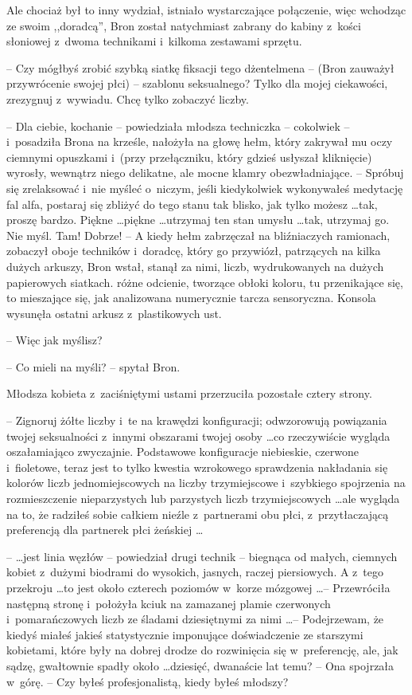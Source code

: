 \documentclass[oneside,polish,11pt,rmheadings]{mwbk}
\begin{document}
Ale chociaż był to inny wydział, istniało wystarczające połączenie, więc wchodząc ze swoim ,,doradcą'', Bron został natychmiast zabrany do kabiny z~kości słoniowej z~dwoma technikami i~kilkoma zestawami sprzętu. 

-- Czy mógłbyś zrobić szybką siatkę fiksacji tego dżentelmena --  (Bron zauważył przywrócenie swojej płci) -- szablonu seksualnego? Tylko dla mojej ciekawości, zrezygnuj z~wywiadu. Chcę tylko zobaczyć liczby. 

-- Dla ciebie, kochanie  -- powiedziała  młodsza techniczka -- cokolwiek -- i~posadziła Brona na krześle, nałożyła na głowę hełm, który zakrywał mu oczy ciemnymi opuszkami i~(przy przełączniku, który gdzieś usłyszał kliknięcie) wyrosły, wewnątrz niego delikatne, ale mocne klamry obezwładniające. -- Spróbuj się zrelaksować i~nie myśleć o~niczym, jeśli kiedykolwiek wykonywałeś medytację fal alfa, postaraj się zbliżyć do tego stanu tak blisko, jak tylko możesz \ldots  tak, proszę bardzo. Piękne \ldots  piękne \ldots  utrzymaj ten stan umysłu \ldots  tak, utrzymaj go. Nie myśl.  Tam! Dobrze! -- A kiedy hełm zabrzęczał na bliźniaczych ramionach, zobaczył oboje techników i~doradcę, który go przywiózł, patrzących na kilka dużych arkuszy, Bron wstał, stanął za nimi, liczb, wydrukowanych na dużych papierowych siatkach. różne odcienie, tworzące obłoki koloru, tu przenikające się, to mieszające się, jak analizowana numerycznie tarcza sensoryczna. Konsola wysunęła ostatni arkusz z~plastikowych ust. 

-- Więc jak myślisz? 

-- Co mieli na myśli? --  spytał Bron. 

Młodsza kobieta z~zaciśniętymi ustami przerzuciła pozostałe cztery strony. 

-- Zignoruj żółte liczby i~te na krawędzi konfiguracji; odwzorowują powiązania twojej seksualności z~innymi obszarami twojej osoby \ldots  co rzeczywiście wygląda oszałamiająco zwyczajnie. Podstawowe konfiguracje niebieskie, czerwone i~fioletowe, teraz jest to tylko kwestia wzrokowego sprawdzenia nakładania się kolorów liczb jednomiejscowych na liczby trzymiejscowe i~szybkiego spojrzenia na rozmieszczenie nieparzystych lub parzystych liczb trzymiejscowych  \ldots ale wygląda na to, że radziłeś sobie całkiem nieźle z~partnerami obu płci, z~przytłaczającą preferencją dla partnerek płci żeńskiej \ldots  

--  \ldots jest linia węzłów -- powiedział drugi technik -- biegnąca od małych, ciemnych kobiet z~dużymi biodrami do wysokich, jasnych, raczej piersiowych. A z~tego przekroju \ldots  to jest około czterech poziomów w~korze mózgowej \ldots  -- Przewróciła następną stronę i~położyła kciuk na zamazanej plamie czerwonych i~pomarańczowych liczb ze śladami dziesiętnymi za nimi \ldots  -- Podejrzewam, że kiedyś miałeś jakieś statystycznie imponujące doświadczenie ze starszymi kobietami, które były na dobrej drodze do rozwinięcia się w~preferencję, ale, jak sądzę, gwałtownie spadły około \ldots  dziesięć, dwanaście lat temu? --  Ona spojrzała w~górę. -- Czy byłeś profesjonalistą, kiedy byłeś młodszy? 
\end{document}
